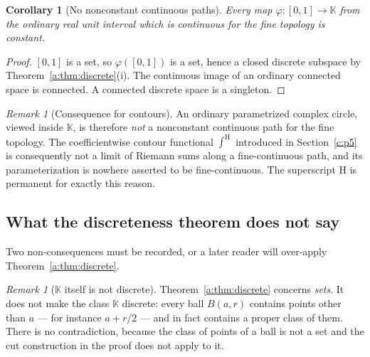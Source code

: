 \documentclass[11pt,a4paper]{article}
\numberwithin{equation}{section}
\newtheorem{corollary}[theorem]{Corollary}
\theoremstyle{definition}
\theoremstyle{remark}
\newtheorem{remark}[theorem]{Remark}
\theoremstyle{plain}
\newcommand{\K}{\mathbb K}
\newcommand{\intH}{{\int^{\mathrm H}}}
\begin{document}
\begin{corollary}[No nonconstant continuous paths]\label{a:cor:nopath}
Every map $\varphi:[0,1]\to\K$ from the ordinary real unit interval
which is continuous for the fine topology is constant.
\end{corollary}

\begin{proof}
$[0,1]$ is a set, so $\varphi([0,1])$ is a set, hence a closed discrete
subspace by Theorem~\ref{a:thm:discrete}(i).  The continuous image of an
ordinary connected space is connected.  A connected discrete space is a
singleton.
\end{proof}

\begin{remark}[Consequence for contours]\label{a:rule:contour}
An ordinary parametrized complex circle, viewed inside $\K$, is
therefore \emph{not} a nonconstant continuous path for the fine
topology.  The coefficientwise contour functional $\intH$ introduced in
Section~\ref{c:p5} is consequently not a limit of Riemann sums along a fine-continuous
path, and its parameterization is nowhere asserted to be fine-continuous.
The superscript $\mathrm H$ is permanent for exactly this reason.
\end{remark}

\subsection{What the discreteness theorem does not say}\label{a:rem:nonconsequences}

Two non-consequences must be recorded, or a later reader will
over-apply Theorem~\ref{a:thm:discrete}.

\begin{remark}[$\K$ itself is not discrete]\label{a:rem:notdiscrete}
Theorem~\ref{a:thm:discrete} concerns \emph{sets}.  It does not make the
class $\K$ discrete: every ball $B(a,r)$ contains points other than $a$
--- for instance $a+r/2$ --- and in fact contains a proper class of
them.  There is no contradiction, because the class of points of a ball
is not a set and the cut construction in the proof does not apply to it.
\end{remark}
\end{document}
